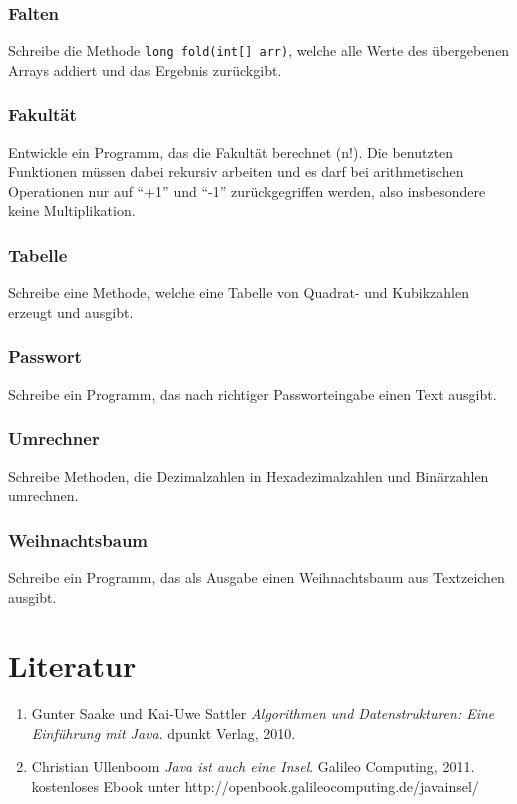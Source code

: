 		\subsubsection{Falten}
			Schreibe die Methode \lstinline$long fold(int[] arr)$, welche alle Werte des übergebenen Arrays addiert und das Ergebnis zurückgibt.
		\subsubsection{Fakultät}
			Entwickle ein Programm, das die Fakultät berechnet (n!). Die benutzten Funktionen müssen dabei rekursiv arbeiten und es darf bei arithmetischen Operationen nur auf ``+1'' und ``-1'' zurückgegriffen werden, also insbesondere keine Multiplikation.
		\subsubsection{Tabelle}
			Schreibe eine Methode, welche eine Tabelle von Quadrat- und Kubikzahlen erzeugt und ausgibt.
		\subsubsection{Passwort}
			Schreibe ein Programm, das nach richtiger Passworteingabe einen Text ausgibt.
		\subsubsection{Umrechner}
			Schreibe Methoden, die Dezimalzahlen in Hexadezimalzahlen und Binärzahlen umrechnen.
		\subsubsection{Weihnachtsbaum}
			Schreibe ein Programm, das als Ausgabe einen Weihnachtsbaum aus Textzeichen ausgibt.


\section{Literatur}

\renewcommand{\labelenumi}{[\arabic{enumi}]}
\renewcommand{\theenumi}{[\arabic{enumi}]}
\begin{enumerate}
\item
Gunter Saake und Kai-Uwe Sattler \textit{Algorithmen und Datenstrukturen: Eine Einführung mit Java}. 
dpunkt Verlag, 2010.
\item
Christian Ullenboom \textit{Java ist auch eine Insel}. Galileo Computing, 2011. kostenloses Ebook unter http://openbook.galileocomputing.de/javainsel/

\end{enumerate}
\pagestyle{scrplain}
\ofoot[]{}

\cleardoublepage
%
